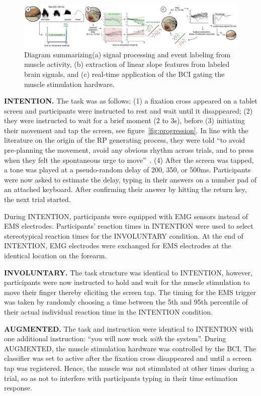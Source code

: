 \begin{figure}[t]
    \centering
    \includegraphics[width=\textwidth]{figures/method.png}
    \caption{Diagram summarizing(a) signal processing and event labeling from muscle activity, (b) extraction of linear slope features from labeled brain signals, and (c) real-time application of the BCI gating the muscle stimulation hardware.}
    \label{fig:method}
\end{figure}

\indent\textbf{INTENTION.} The task was as follows: (1) a fixation cross appeared on a tablet screen and participants were instructed to rest and wait until it disappeared; (2) they were instructed to wait for a brief moment (2 to 3s), before (3) initiating their movement and tap the screen, see figure~\ref{fig:progression}. In line with the literature on the origin of the RP generating process, they were told ``to avoid pre-planning the movement, avoid any obvious rhythm across trials, and to press when they felt the spontaneous urge to move''~\cite{Schultze-Kraft2021-cu}. (4) After the screen was tapped, a tone was played at a pseudo-random delay of 200, 350, or 500ms. Participants were now asked to estimate the delay, typing in their answers on a number pad of an attached keyboard. After confirming their answer by hitting the return key, the next trial started.

During INTENTION, participants were equipped with EMG sensors instead of EMS electrodes. Participants' reaction times in INTENTION were used to select stereotypical reaction times for the INVOLUNTARY condition. At the end of INTENTION, EMG electrodes were exchanged for EMS electrodes at the identical location on the forearm.

\indent\textbf{INVOLUNTARY.} The task structure was identical to INTENTION, however, participants were now instructed to hold and wait for the muscle stimulation to move their finger thereby eliciting the screen tap. The timing for the EMS trigger was taken by randomly choosing a time between the 5th and 95th percentile of their actual individual reaction time in the INTENTION condition. 

\indent\textbf{AUGMENTED.} The task and instruction were identical to INTENTION with one additional instruction: ``you will now work \textit{with} the system''. During AUGMENTED, the muscle stimulation hardware was controlled by the BCI. The classifier was set to active after the fixation cross disappeared and until a screen tap was registered. Hence, the muscle was not stimulated at other times during a trial, so as not to interfere with participants typing in their time estimation response.

